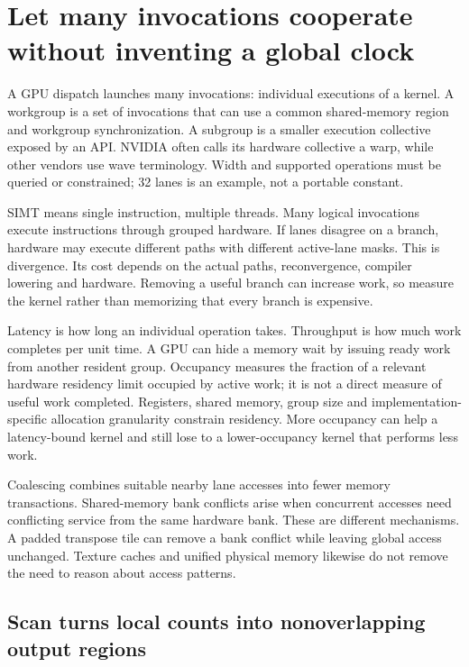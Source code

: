 \section{Let many invocations cooperate without inventing a global clock}\label{03-visual-computing-i-ch015-let-many-invocations-cooperate-without-inventing-a-global-clock}

A GPU dispatch launches many invocations: individual executions of a kernel. A workgroup is a set of invocations that can use a common shared-memory region and workgroup synchronization. A subgroup is a smaller execution collective exposed by an API. NVIDIA often calls its hardware collective a warp, while other vendors use wave terminology. Width and supported operations must be queried or constrained; 32 lanes is an example, not a portable constant.

SIMT means single instruction, multiple threads. Many logical invocations execute instructions through grouped hardware. If lanes disagree on a branch, hardware may execute different paths with different active-lane masks. This is divergence. Its cost depends on the actual paths, reconvergence, compiler lowering and hardware. Removing a useful branch can increase work, so measure the kernel rather than memorizing that every branch is expensive.

Latency is how long an individual operation takes. Throughput is how much work completes per unit time. A GPU can hide a memory wait by issuing ready work from another resident group. Occupancy measures the fraction of a relevant hardware residency limit occupied by active work; it is not a direct measure of useful work completed. Registers, shared memory, group size and implementation-specific allocation granularity constrain residency. More occupancy can help a latency-bound kernel and still lose to a lower-occupancy kernel that performs less work.

Coalescing combines suitable nearby lane accesses into fewer memory transactions. Shared-memory bank conflicts arise when concurrent accesses need conflicting service from the same hardware bank. These are different mechanisms. A padded transpose tile can remove a bank conflict while leaving global access unchanged. Texture caches and unified physical memory likewise do not remove the need to reason about access patterns.

\subsection{Scan turns local counts into nonoverlapping output regions}\label{03-visual-computing-i-ch015-scan-turns-local-counts-into-nonoverlapping-output-regions}

